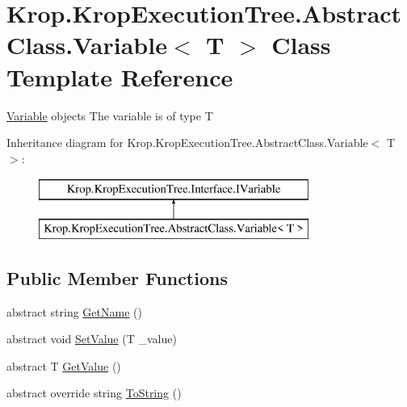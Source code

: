 \hypertarget{class_krop_1_1_krop_execution_tree_1_1_abstract_class_1_1_variable}{}\section{Krop.\+Krop\+Execution\+Tree.\+Abstract\+Class.\+Variable$<$ T $>$ Class Template Reference}
\label{class_krop_1_1_krop_execution_tree_1_1_abstract_class_1_1_variable}


\mbox{\hyperlink{class_krop_1_1_krop_execution_tree_1_1_abstract_class_1_1_variable}{Variable}} objects The variable is of type T  


Inheritance diagram for Krop.\+Krop\+Execution\+Tree.\+Abstract\+Class.\+Variable$<$ T $>$\+:\begin{figure}[H]
\begin{center}
\leavevmode
\includegraphics[height=2.000000cm]{class_krop_1_1_krop_execution_tree_1_1_abstract_class_1_1_variable}
\end{center}
\end{figure}
\subsection*{Public Member Functions}
\begin{DoxyCompactItemize}
\item 
abstract string \mbox{\hyperlink{class_krop_1_1_krop_execution_tree_1_1_abstract_class_1_1_variable_a987550c24ebd0ceb01aec0b6edf51dfb}{Get\+Name}} ()
\item 
abstract void \mbox{\hyperlink{class_krop_1_1_krop_execution_tree_1_1_abstract_class_1_1_variable_ac2022740855edfe2c1fdcea60d877fa4}{Set\+Value}} (T \+\_\+value)
\item 
abstract T \mbox{\hyperlink{class_krop_1_1_krop_execution_tree_1_1_abstract_class_1_1_variable_a9d77d99b187893c15c5847ffa6fe0daf}{Get\+Value}} ()
\item 
abstract override string \mbox{\hyperlink{class_krop_1_1_krop_execution_tree_1_1_abstract_class_1_1_variable_ae78ccbb029efb966e1edff0ae101f367}{To\+String}} ()
\end{DoxyCompactItemize}


